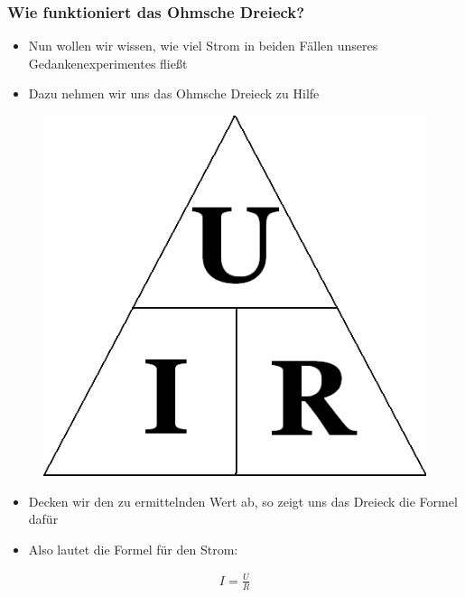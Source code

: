 \begin{frame}
  \frametitle{Wie funktioniert das Ohmsche Dreieck?}
  \begin{itemize}
    \item Nun wollen wir wissen, wie viel Strom in beiden Fällen unseres Gedankenexperimentes fließt
    \item Dazu nehmen wir uns das Ohmsche Dreieck zu Hilfe
  \end{itemize}
  \begin{center}
    \begin{figure}
      \includegraphics[width=\textwidth,height=.2\textheight,keepaspectratio]{e03/Ohm_law_triangle.png}
    \end{figure}
  \end{center}
  \begin{itemize}
    \item Decken wir den zu ermittelnden Wert ab, so zeigt uns das Dreieck die Formel dafür
    \item Also lautet die Formel für den Strom:
  \end{itemize}
  \begin{align}
    I = \frac{U}{R}
    \label{equ:Strom}
  \end{align}
\end{frame}

